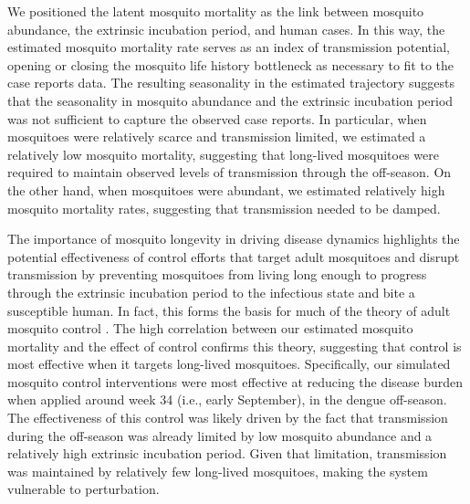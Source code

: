\documentclass[10pt,letterpaper]{article}
\begin{document}
We positioned the latent mosquito mortality as the link between mosquito abundance, the extrinsic incubation period, and human cases.
In this way, the estimated mosquito mortality rate serves as an index of transmission potential, opening or closing the mosquito life history bottleneck \cite{Smith2012} as necessary to fit to the case reports data.
The resulting seasonality in the estimated trajectory suggests that the seasonality in mosquito abundance and the extrinsic incubation period was not sufficient to capture the observed case reports.
In particular, when mosquitoes were relatively scarce and transmission limited, we estimated a  relatively low mosquito mortality, suggesting that long-lived mosquitoes were required to maintain observed levels of transmission through the off-season.  
On the other hand, when mosquitoes were abundant, we estimated relatively high mosquito mortality rates, suggesting that transmission needed to be damped.

The importance of mosquito longevity in driving disease dynamics highlights the potential effectiveness of control efforts that target adult mosquitoes and disrupt transmission by preventing mosquitoes from living long enough to progress through the extrinsic incubation period to the infectious state and bite a susceptible human.
In fact, this forms the basis for much of the theory of adult mosquito control \cite{Burattini2008, Morrison2008, Smith2012}.
The high correlation between our estimated mosquito mortality and the effect of control confirms this theory, suggesting that control is most effective when it targets long-lived mosquitoes.  
Specifically, our simulated mosquito control interventions were most effective at reducing the disease burden when applied around week 34 (i.e., early September), in the dengue off-season.
The effectiveness of this control was likely driven by the fact that transmission during the off-season was already limited by low mosquito abundance and a relatively high extrinsic incubation period.
Given that limitation, transmission was maintained by relatively few long-lived mosquitoes, making the system vulnerable to perturbation.
\end{document}
